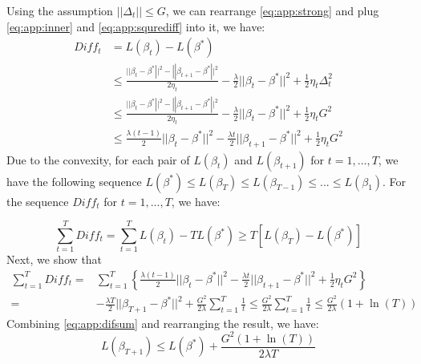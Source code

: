 	Using the assumption $||\Delta_t|| \leq G$, we can rearrange \eqref{eq:app:strong} and plug \eqref{eq:app:inner} and \eqref{eq:app:squrediff} into it, we have:	
	\begin{equation}\label{eq:app:it_diff}
	\begin{aligned}
	{Diff}_t &= L(\beta_t)-L(\beta^*)\\\
	 &\leq \frac{{||{\beta _t} - {\beta ^*}|{|^2} - ||{\beta _{t + 1}} - {\beta ^*}|{|^2}}}{{2{\eta _t}}} - \frac{\lambda }{2}||{\beta _t} - {\beta ^*}|{|^2} + \frac{1}{2}{\eta _t}\Delta _t^2 \\
	&\leq \frac{{||{\beta _t} - {\beta ^*}|{|^2} - ||{\beta _{t + 1}} - {\beta ^*}|{|^2}}}{{2{\eta _t}}} - \frac{\lambda }{2}||{\beta _t} - {\beta ^*}|{|^2} + \frac{1}{2}{\eta _t} G^2\\
	&\le\frac{\lambda (t-1)}{2}{||{\beta _t} - {\beta ^*}||^2}- \frac{\lambda t}{2}{||{\beta _{t+1}} - {\beta ^*}||^2}+\frac{1}{2}{\eta _t} G^2
	\end{aligned}
	\end{equation}	
	Due to the convexity, for each pair of $L(\beta_t)$ and $L(\beta_{t+1})$ for $t=1,...,T$, 
	we have the following sequence $L(\beta^*) \leq L(\beta_T) \leq L(\beta_{T-1}) \leq...\leq L(\beta_1)$. 
	For the sequence $Diff_t$ for $t=1,...,T$, we have:
	
	\begin{equation} \label{eq:app:difsum}
	\sum_{t=1}^{T} Diff_t =  \sum_{t=1}^{T}L(\beta_t)-TL(\beta^*) \geq T\left[L(\beta_T)-L(\beta^*)\right]
	\end{equation}	
	Next, we show that 	
	\begin{equation}
	\begin{aligned}
	\sum_{t=1}^{T} Diff_t =&
	\sum_{t=1}^{T}\left\{\frac{\lambda (t-1)}{2}{||{\beta _t} - {\beta ^*}||^2}- \frac{\lambda t}{2}{||{\beta _{t+1}} - {\beta ^*}||^2}+\frac{1}{2}{\eta _t} G^2\right\} \\
	=&-\frac{\lambda T}{2}{||{\beta _{T+1}-\beta^*}||^2} + \frac{G^2}{2 \lambda}\sum_{t=1}^{T} \frac{1}{t}\leq \frac{G^2}{2 \lambda}\sum_{t=1}^{T} \frac{1}{t} \leq \frac{G^2}{2 \lambda}(1+\ln(T))
	\end{aligned}
	\end{equation}	
	Combining \eqref{eq:app:difsum} and rearranging the result, we have:
	\begin{equation*}
	L(\beta_{T+1}) \leq L(\beta^*)+\frac{G^2(1+\ln (T))}{2\lambda T}
	\end{equation*}
